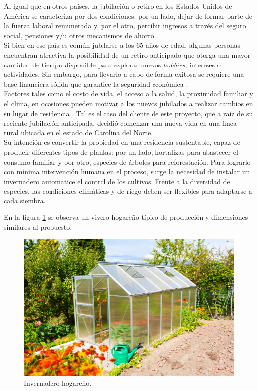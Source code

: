 Al igual que en otros países, la jubilación o retiro en los Estados Unidos de América se caracteriza por dos condiciones: por un lado, dejar de formar parte de la fuerza laboral remunerada y, por el otro, percibir ingresos a través del seguro social, pensiones y/u otros mecanismos de ahorro \citep{csreports:1}. \\
Si bien en ese país es común jubilarse a los 65 años de edad, algunas personas encuentran atractiva la posibilidad de un retiro anticipado que otorga una mayor cantidad de tiempo disponible para explorar nuevos \textit{hobbies}, intereses o actividades. Sin embargo, para llevarlo a cabo de forma exitosa se requiere una base financiera sólida que garantice la seguridad económica \citep{yahoo:1}. \\
Factores tales como el costo de vida, el acceso a la salud, la proximidad familiar y el clima, en ocasiones pueden motivar a los nuevos jubilados a realizar cambios en su lugar de residencia  \citep{RelocatingAfterRetiring} \citep{Kim2021}. Tal es el caso del cliente de este proyecto, que a raíz de su reciente jubilación anticipada, decidió comenzar una nueva vida en una finca rural ubicada en el estado de Carolina del Norte. \\
Su intención es convertir la propiedad en una residencia sustentable, capaz de producir diferentes tipos de plantas: por un lado, hortalizas para abastecer el consumo familiar y por otro, especies de árboles para reforestación.  
Para lograrlo con mínima intervención humana en el proceso, surge la necesidad de instalar un invernadero automatice el control de los cultivos. Frente a la diversidad de especies, las condiciones climáticas y de riego deben ser flexibles para adaptarse a cada siembra. 


 
En la figura \ref{fig:imgInvernadero} se observa un vivero hogareño típico de producción y dimensiones similares al propuesto.




\begin{figure}[htpb]
\centering 
\includegraphics[width=.7\textwidth]{../Figures/invernadero1.jpg}
\caption{Invernadero hogareño\protect\footnotemark.}
\label{fig:imgInvernadero}
\end{figure}


